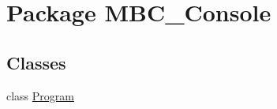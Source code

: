 \hypertarget{namespace_m_b_c___console}{\section{Package M\-B\-C\-\_\-\-Console}
\label{namespace_m_b_c___console}
}
\subsection*{Classes}
\begin{DoxyCompactItemize}
\item 
class \hyperlink{class_m_b_c___console_1_1_program}{Program}
\end{DoxyCompactItemize}
